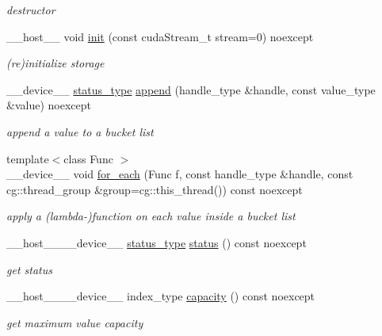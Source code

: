 \begin{DoxyCompactItemize}
\begin{DoxyCompactList}\small\item\em destructor \end{DoxyCompactList}\item 
\+\_\+\+\_\+host\+\_\+\+\_\+ void \hyperlink{classwarpcore_1_1storage_1_1multi__value_1_1BucketListStore_a269ad2dfbb2f4ba86aa0746d1db6d019}{init} (const cuda\+Stream\+\_\+t stream=0) noexcept
\begin{DoxyCompactList}\small\item\em (re)initialize storage \end{DoxyCompactList}\item 
\+\_\+\+\_\+device\+\_\+\+\_\+ \hyperlink{classwarpcore_1_1Status}{status\+\_\+type} \hyperlink{classwarpcore_1_1storage_1_1multi__value_1_1BucketListStore_aa5125c08967a202f1616c75bc93956d3}{append} (handle\+\_\+type \&handle, const value\+\_\+type \&value) noexcept
\begin{DoxyCompactList}\small\item\em append a value to a bucket list \end{DoxyCompactList}\item 
{\footnotesize template$<$class Func $>$ }\\\+\_\+\+\_\+device\+\_\+\+\_\+ void \hyperlink{classwarpcore_1_1storage_1_1multi__value_1_1BucketListStore_aed554156f072838045ee27ef654bd5cd}{for\+\_\+each} (Func f, const handle\+\_\+type \&handle, const cg\+::thread\+\_\+group \&group=cg\+::this\+\_\+thread()) const noexcept
\begin{DoxyCompactList}\small\item\em apply a (lambda-\/)function on each value inside a bucket list \end{DoxyCompactList}\item 
\+\_\+\+\_\+host\+\_\+\+\_\+\+\_\+\+\_\+device\+\_\+\+\_\+ \hyperlink{classwarpcore_1_1Status}{status\+\_\+type} \hyperlink{classwarpcore_1_1storage_1_1multi__value_1_1BucketListStore_a89173b5956d3bf4c8f2ed4bb9a7d50a7}{status} () const noexcept
\begin{DoxyCompactList}\small\item\em get status \end{DoxyCompactList}\item 
\+\_\+\+\_\+host\+\_\+\+\_\+\+\_\+\+\_\+device\+\_\+\+\_\+ index\+\_\+type \hyperlink{classwarpcore_1_1storage_1_1multi__value_1_1BucketListStore_a8ac7aed144f65fb6e6bae1b56d076fab}{capacity} () const noexcept
\begin{DoxyCompactList}\small\item\em get maximum value capacity \end{DoxyCompactList}\item 

\end{DoxyCompactItemize}
